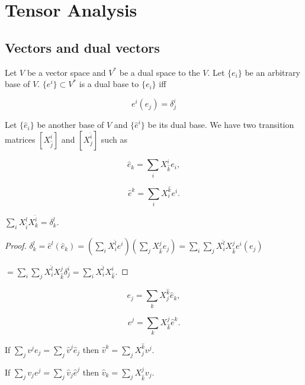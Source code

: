 \documentclass[main.tex]{subfiles}
\begin{document}
\section{Tensor Analysis}
\subsection{Vectors and dual vectors}

Let $V$ be a vector space and $V^*$ be a dual space to the $V$. Let $\{e_i\}$ be an arbitrary base of $V$. $\{e^i\}\subset V^*$ is a dual base to $\{e_i\}$ iff

\begin{equation}
\boxed{e^i(e_j) = \delta^i_j}
\end{equation}

\noindent
Let $\{\hat{e}_i\}$ be another base of $V$ and $\{\hat{e}^i\}$ be its dual base. We have two transition matrices
$[X^i_{\hat{j}}]$ and $[X^{\hat{i}}_{j}]$ such as

\begin{equation}
\label{con_trans}
\hat{e}_k = \sum_i X^i_{\hat{k}}e_i,
\end{equation}

\begin{equation}
\hat{e}^k = \sum_i X^{\hat{k}}_i e^i.
\end{equation}

\begin{fact}
$\sum_i X^l_{\hat{i}}X^{\hat{i}}_k = \delta^l_k.$
\end{fact}
\begin{proof}
$\delta^l_k = \hat{e}^l(\hat{e}_k) = (\sum_i X^{\hat{l}}_i e^i)(\sum_j X^j_{\hat{k}}e_j) = 
\sum_i\sum_j X^{\hat{l}}_i X^j_{\hat{k}} e^i(e_j)$

$= \sum_i\sum_j X^{\hat{l}}_i X^j_{\hat{k}} \delta^i_j = \sum_i X^{\hat{l}}_i X^i_{\hat{k}}.$
\end{proof}
\begin{corollary}
$$
e_j = \sum_k X^{\hat{k}}_j \hat{e}_k,
$$

$$
e^j = \sum_k X^j_{\hat{k}} \hat{e}^k.
$$
\end{corollary}

\begin{corollary}
If $\sum_j v^j e_j = \sum_j \hat{v}^j \hat{e}_j$ then $\hat{v}^k = \sum_j X^{\hat{k}}_j v^j$.
\end{corollary}

\begin{corollary}
If $\sum_j v_j e^j = \sum_j \hat{v}_j \hat{e}^j$ then $\hat{v}_k = \sum_j X^j_{\hat{k}} v_j$.
\end{corollary}
\end{document}
